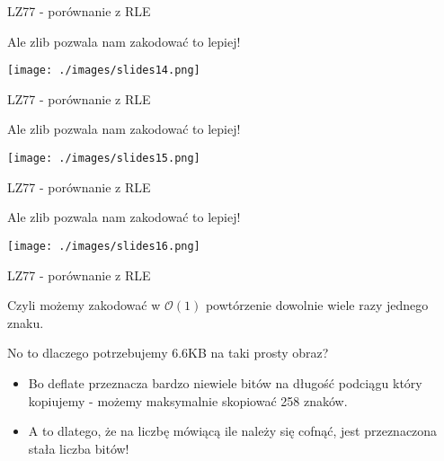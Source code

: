 \documentclass[presentation]{beamer}
\begin{document}
\begin{frame}[label={sec:orgf574d20}]{LZ77 - porównanie z RLE}
\begin{block}{Ale zlib pozwala nam zakodować to lepiej!}
\begin{center}
\texttt{[image: ./images/slides14.png]}
\end{center}
\end{block}
\end{frame}

\begin{frame}[label={sec:orgab161c5}]{LZ77 - porównanie z RLE}
\begin{block}{Ale zlib pozwala nam zakodować to lepiej!}
\begin{center}
\texttt{[image: ./images/slides15.png]}
\end{center}
\end{block}
\end{frame}

\begin{frame}[label={sec:orgf970bdd}]{LZ77 - porównanie z RLE}
\begin{block}{Ale zlib pozwala nam zakodować to lepiej!}
\begin{center}
\texttt{[image: ./images/slides16.png]}
\end{center}
\end{block}
\end{frame}

\begin{frame}[label={sec:org6f05613}]{LZ77 - porównanie z RLE}
\begin{block}{Czyli możemy zakodować w \(\mathcal{O}(1)\) powtórzenie dowolnie wiele razy jednego znaku.}
\end{block}
\begin{block}{No to dlaczego potrzebujemy 6.6KB na taki prosty obraz?}
\begin{itemize}
\item Bo deflate przeznacza bardzo niewiele bitów na długość podciągu
który kopiujemy - możemy maksymalnie skopiować 258 znaków.
\item A to dlatego, że na liczbę mówiącą ile należy się cofnąć, jest
przeznaczona stała liczba bitów!
\end{itemize}
\end{block}
\end{frame}
\end{document}

